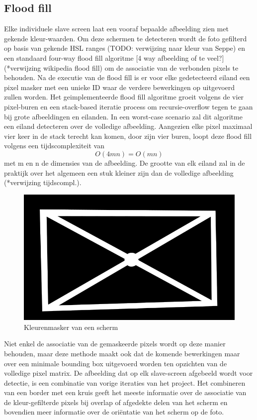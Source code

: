 \subsection{Flood fill}
Elke individuele slave screen laat een vooraf bepaalde afbeelding zien met gekende kleur-waarden. Om deze schermen te detecteren wordt de foto gefilterd op basis van gekende HSL ranges (TODO: verwijzing naar kleur van Seppe) en een standaard four-way flood fill algoritme [4 way afbeelding of te veel?] (*verwijzing wikipedia flood fill) om de associatie van de verbonden pixels te behouden. Na de executie van de flood fill is er voor elke gedetecteerd eiland een pixel masker met een unieke ID waar de verdere bewerkingen op uitgevoerd zullen worden. Het geimplementeerde flood fill algoritme groeit volgens de vier pixel-buren en een stack-based iteratie process om recursie-overflow tegen te gaan bij grote afbeeldingen en eilanden. In een worst-case scenario zal dit algoritme een eiland detecteren over de volledige afbeelding. Aangezien elke pixel maximaal vier keer in de stack terecht kan komen, door zijn vier buren, loopt deze flood fill volgens een tijdscomplexiteit van 
\[O(4mn)=O(mn)\]
 met m en n de dimensies van de afbeelding. De grootte van elk eiland zal in de praktijk over het algemeen een stuk kleiner zijn dan de volledige afbeelding (*verwijzing tijdscompl.).

\begin{figure}[h]
\centering
\includegraphics[scale=0.6]{img/mask.png}
\caption{Kleurenmasker van een scherm}
\end{figure}

Niet enkel de associatie van de gemaskeerde pixels wordt op deze manier behouden, maar deze methode maakt ook dat de komende bewerkingen maar over een minimale bounding box uitgevoerd worden ten opzichten van de volledige pixel matrix.
De afbeelding dat op elk slave-screen afgebeeld wordt voor detectie, is een combinatie van vorige iteraties van het project. Het combineren van een border met een kruis geeft het meeste informatie over de associatie van de kleur-gefilterde pixels bij overlap of afgedekte delen van het scherm en bovendien meer informatie over de oriëntatie van het scherm op de foto.

